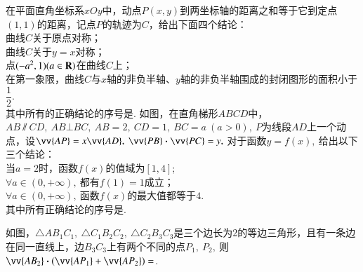 \documentclass{BHCexam}
\begin{document}
\begin{questions}
\qs 在平面直角坐标系$xOy$中，动点$ P(x,y) $到两坐标轴的距离之和等于它到定点$ (1,1) $的距离，记点$ P $的轨迹为$ C $，给出下面四个结论：\\
 曲线$ C $关于原点对称；\\
 曲线$ C $关于$ y=x $对称；\\
 点$ (-a^2,1)(a\in\mathbf{R}) $在曲线$ C $上；\\
 在第一象限，曲线$ C $与$x$轴的非负半轴、$y$轴的非负半轴围成的封闭图形的面积小于$ \dfrac{1}{2}. $\\
其中所有的正确结论的序号是\tk.
\qs 如图，在直角梯形$ ABCD $中，$ AB\sslash CD,~AB\bot BC,~AB=2,~CD=1,~BC=a~(a>0),~ P$为线段$ AD $上一个动点，设$ \vv{AP}=x\vv{AD},~ \vv{PB}\bm{\cdot}\vv{PC}=y,~$对于函数$y=f(x),~$给出以下三个结论：\\
 当$ a=2 $时，函数$f(x)$的值域为$ \left[1,4\right] $;\\
 $ \forall a\in\left(0,+\infty\right),~$都有$ f(1)=1 $成立；\\
 $ \forall a\in\left(0,+\infty\right),~$函数$f(x)$的最大值都等于$ 4 $.\\
其中所有正确结论的序号是\tk.
\vspace{-7em}
\begin{flushright}
\end{flushright}
\qs 如图，$ \triangle AB_1C_1,~\triangle C_1B_2C_2,~\triangle C_2B_3C_3 $是三个边长为2的等边三角形，且有一条边在同一直线上，边$ B_3C_3 $上有两个不同的点$ P_1,~P_2,~ $则$ \vv{AB_2}\bm{\cdot}(\vv{AP_1}+\vv{AP_2}) =$\tk.


\end{questions}
\end{document}
